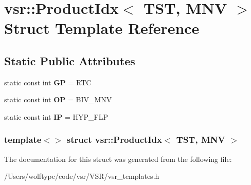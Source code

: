 \hypertarget{structvsr_1_1_product_idx_3_01_t_s_t_00_01_m_n_v_01_4}{\section{vsr\-:\-:Product\-Idx$<$ T\-S\-T, M\-N\-V $>$ Struct Template Reference}
\label{structvsr_1_1_product_idx_3_01_t_s_t_00_01_m_n_v_01_4}
}
\subsection*{Static Public Attributes}
\begin{DoxyCompactItemize}
\item 
\hypertarget{structvsr_1_1_product_idx_3_01_t_s_t_00_01_m_n_v_01_4_af30af8e37ff1da3dde940a3a04050fc3}{static const int {\bfseries G\-P} = R\-T\-C}\label{structvsr_1_1_product_idx_3_01_t_s_t_00_01_m_n_v_01_4_af30af8e37ff1da3dde940a3a04050fc3}

\item 
\hypertarget{structvsr_1_1_product_idx_3_01_t_s_t_00_01_m_n_v_01_4_aebc715c7ee334946917f4636c2686110}{static const int {\bfseries O\-P} = B\-I\-V\-\_\-\-M\-N\-V}\label{structvsr_1_1_product_idx_3_01_t_s_t_00_01_m_n_v_01_4_aebc715c7ee334946917f4636c2686110}

\item 
\hypertarget{structvsr_1_1_product_idx_3_01_t_s_t_00_01_m_n_v_01_4_a0facf2ba4302be00c14c02286e20b761}{static const int {\bfseries I\-P} = H\-Y\-P\-\_\-\-F\-L\-P}\label{structvsr_1_1_product_idx_3_01_t_s_t_00_01_m_n_v_01_4_a0facf2ba4302be00c14c02286e20b761}

\end{DoxyCompactItemize}
\subsubsection*{template$<$$>$ struct vsr\-::\-Product\-Idx$<$ T\-S\-T, M\-N\-V $>$}



The documentation for this struct was generated from the following file\-:\begin{DoxyCompactItemize}
\item 
/\-Users/wolftype/code/vsr/\-V\-S\-R/vsr\-\_\-templates.\-h\end{DoxyCompactItemize}
